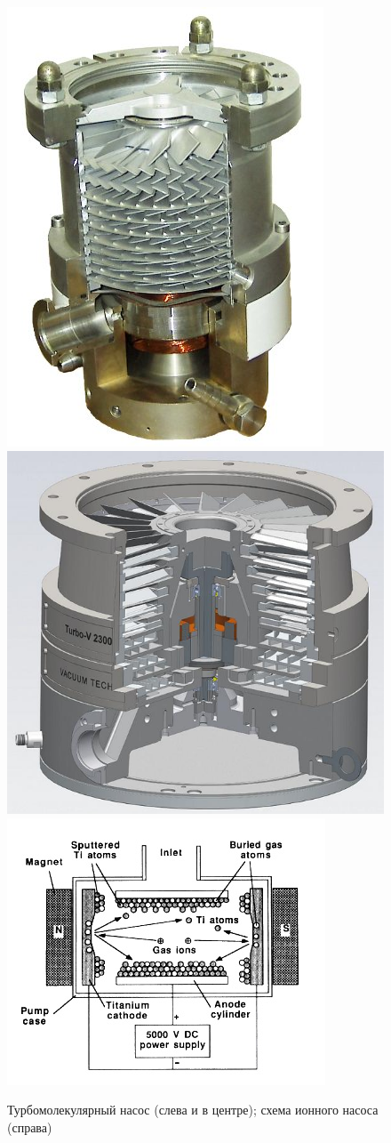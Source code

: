 \documentclass[12pt]{article}
\begin{document}
\begin{figure}
	\centering
	\includegraphics[width=0.3\linewidth]{pictures/turbomolecular_pump.jpg}
	\hspace{0.5cm}
	\includegraphics[width=0.3\linewidth]{pictures/turbomolecular_pump2.jpg}
	\hspace{0.5cm}
	\includegraphics[width=0.3\linewidth]{pictures/ion_pump.jpg}
	\caption{Турбомолекулярный насос (слева и в центре); схема ионного насоса (справа)}
\end{figure}
\end{document}
